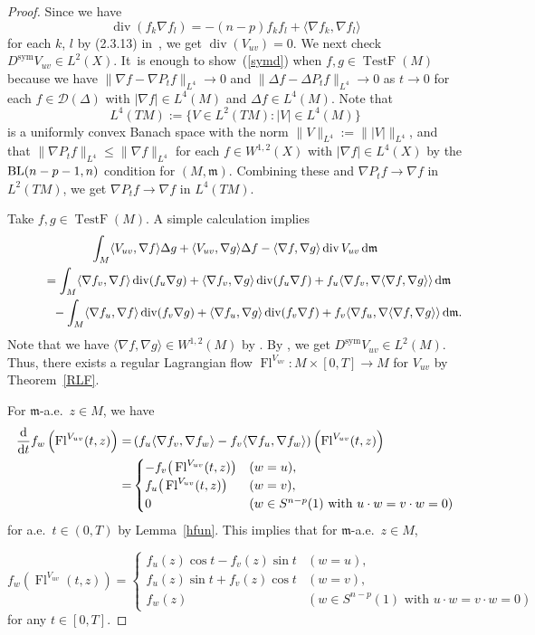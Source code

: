 \documentclass[pdftex]{sigma}
\numberwithin{equation}{section}
\theoremstyle{definition}
\newcommand{\TestF}{\operatorname{TestF}}
\newcommand{\sym}{\operatorname{sym}}
\newcommand{\Fl}{\operatorname{Fl}}
\newcommand{\mf}{\mathfrak{m}}
\newcommand{\Div}{\operatorname{div}}
\newcommand{\BL}{{\rm BL}}
\newcommand{\D}{\mathcal{D}}
\begin{document}
\begin{proof}
Since we have
\[
\Div(f_k\nabla f_l)=-(n-p)f_k f_l+\langle\nabla f_k,\nabla f_l\rangle
\]
for each $k$, $l$ by (2.3.13) in~\cite{Gig}, we get $\Div(V_{u v})=0$.
We next check $D^{\sym} V_{u v}\in L^2(X)$.
It~is enough to show~(\ref{symd}) when $f,g\in\TestF(M)$ because
we have $\|\nabla f -\nabla P_t f\|_{L^4}\to 0$ and $\|\Delta f-\Delta P_t f\|_{L^4}\to 0$ as $t\to 0$ for each $f\in \D(\Delta)$ with $|\nabla f|\in L^4(M)$ and $\Delta f\in L^4(M)$.
Note that
\[
L^4(T M):=\{V\in L^2(T M) \colon |V|\in L^4(M)\}
\]
is a uniformly convex Banach space with the norm $\|V\|_{L^4}:=\||V|\|_{L^4}$, and that $\|\nabla P_t f\|_{L^4}\leq \|\nabla f\|_{L^4}$ for each $f\in W^{1,2}(X)$ with $|\nabla f|\in L^4(X)$ by the $\BL(n-p-1,n)$ condition for $(M,\mf)$.
Combining these and $\nabla P_t f\to \nabla f$ in $L^2(T M)$, we get $\nabla P_t f\to \nabla f$ in $L^4(T M)$.

Take $f,g\in\TestF(M)$.
A simple calculation implies
\begin{gather*}
\int_M \langle V_{u v},\nabla f\rangle \Delta g+ \langle V_{u v},\nabla g\rangle\Delta f -\langle\nabla f,\nabla g\rangle\Div V_{u v}\,{\rm d}\mf
\\ \qquad
{}=\int_M \langle\nabla f_v,\nabla f\rangle \Div(f_u\nabla g)+ \langle \nabla f_v,\nabla g\rangle \Div(f_u\nabla f) +f_u\langle \nabla f_v,\nabla\langle\nabla f,\nabla g\rangle\rangle\, {\rm d}\mf
\\ \phantom{ qquad = }
-\int_M \langle\nabla f_u,\nabla f\rangle \Div(f_v\nabla g)+ \langle \nabla f_u,\nabla g\rangle \Div(f_v\nabla f) +f_v\langle \nabla f_u,\nabla\langle\nabla f,\nabla g\rangle\rangle\, {\rm d}\mf.
\end{gather*}
Note that we have $\langle\nabla f,\nabla g\rangle\in W^{1,2}(M)$ by \cite[Proposition~3.1.3]{Gig}.
By \cite[Definition~3.3.1 and~Theorem~3.3.8]{Gig}, we get $D^{\sym} V_{u v}\in L^2(M)$.
Thus, there exists a regular Lagrangian flow $\Fl^{V_{u v}} \colon M\times [0,T]\to M$ for $V_{ u v}$ by Theorem~\ref{RLF}.

For $\mf$-a.e.\ $z\in M$, we have
\begin{align*}
\frac{\rm d}{{\rm d} t}f_w \left(\Fl^{V_{u v}}(t,z)\right)
=&\left(f_u \langle \nabla f_v,\nabla f_w\rangle-f_v\langle\nabla f_u,\nabla f_w\rangle\right) \left(\Fl^{V_{u v}}(t,z)\right)\\
=&
\begin{cases}
-f_v \big(\Fl^{V_{u v}}(t,z)\big)& (w=u),
\\
f_u \big(\Fl^{V_{u v}}(t,z)\big)& (w=v),
\\
0&  (w\in S^{n-p}(1)\text{ with }u\cdot w=v\cdot w=0)
\end{cases}
\end{align*}
for a.e.\ $t\in(0,T)$ by Lemma~\ref{hfun}.
This implies that for $\mf$-a.e.\ $z\in M$,
{\samepage\[
f_w\left(\Fl^{V_{u v}}(t,z)\right)=
\begin{cases}
f_u(z) \cos t- f_v(z)\sin t & (w=u),
\\
f_u(z) \sin t+ f_v(z)\cos t& (w=v),
\\
f_w(z)& (w\in S^{n-p}(1)\text{ with }u\cdot w=v\cdot w=0)
\end{cases}
\]
for any $t\in [0,T]$.

}
\end{proof}
\end{document}
